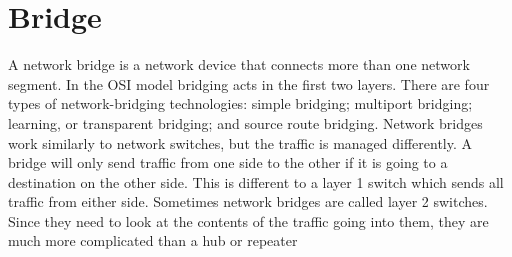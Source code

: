 \section{Bridge}
A network bridge is a network device that connects more than one network segment. In the OSI model bridging acts in the first two layers.
There are four types of network-bridging technologies: simple bridging; multiport bridging; learning, or transparent bridging; and source route bridging.
Network bridges work similarly to network switches, but the traffic is managed differently. A bridge will only send traffic from one side to the other if it is going to a destination on the other side. This is different to a layer 1 switch which sends all traffic from either side. Sometimes network bridges are called layer 2 switches.
Since they need to look at the contents of the traffic going into them, they are much more complicated than a hub or repeater